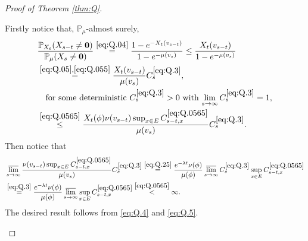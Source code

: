 \documentclass[12pt,a4paper]{amsart}
\numberwithin{equation}{section}
\theoremstyle{plain}
\theoremstyle{definition}
\theoremstyle{remark}
\newenvironment{proof*}[1][\proofname]{
	\renewcommand\qedsymbol{\rule{3mm}{3mm}}
	\begin{proof}[#1]}{\end{proof}}
\begin{document}
\begin{proof}[Proof of Theorem \ref{thm:Q}]
\begin{proof*}
	Firstly notice that, $\mathbb P_\mu$-almost surely,
	\begin{align}
	& \frac{\mathbb P_{X_t}(X_{s-t}\neq \mathbf 0)}{\mathbb P_\mu(X_s\neq \mathbf 0)}
	\overset{\eqref{eq:Q.04}}= \frac{1-e^{- X_t(v_{s-t}) }}{1-e^{- \mu(v_s) }}
	\leq \frac{X_t(v_{s-t}) }{1-e^{- \mu(v_s) }}
	\\\label{eq:Q.3}&\overset{\eqref{eq:Q.05},\eqref{eq:Q.055}}= \frac{X_t(v_{s-t}) }{ \mu(v_s)} C_s^{\eqref{eq:Q.3}}, 
	\\& \quad \text{for some deterministic $C_s^{\eqref{eq:Q.3}}>0$ with $\lim_{s\to \infty} C_s^{\eqref{eq:Q.3}} = 1$,}
	\\\label{eq:Q.4}&\overset{\eqref{eq:Q.0565}}\leq \frac{X_t(\phi) \nu(v_{s-t}) \sup_{x\in E} C_{s-t,x}^{\eqref{eq:Q.0565}}}{ \mu(v_s)} C_s^{\eqref{eq:Q.3}}.
	\end{align}
	Then notice that
\begin{align} 
&  \varlimsup_{s\to \infty}\frac{\nu(v_{s-t}) \sup_{x\in E} C_{s-t,x}^{\eqref{eq:Q.0565}}}{ \mu(v_s)} C_s^{\eqref{eq:Q.3}}
	\overset{\eqref{eq:Q.25}} = \frac{e^{-\lambda t} \nu(\phi)}{\mu(\phi)} \varlimsup_{s\to \infty}C_s^{\eqref{eq:Q.3}} \sup_{x\in E}C_{s-t,x}^{\eqref{eq:Q.0565}} 
	\\\label{eq:Q.5}&\overset{\eqref{eq:Q.3}} = \frac{e^{-\lambda t} \nu(\phi)}{\mu(\phi)} \varlimsup_{s\to \infty} \sup_{x\in E}C_{s-t,x}^{\eqref{eq:Q.0565}} 
	\overset{\eqref{eq:Q.0565}}< \infty. 
\end{align}
	The desired result follows from \eqref{eq:Q.4} and \eqref{eq:Q.5}. 
\end{proof*}
\end{proof}
\end{document}
